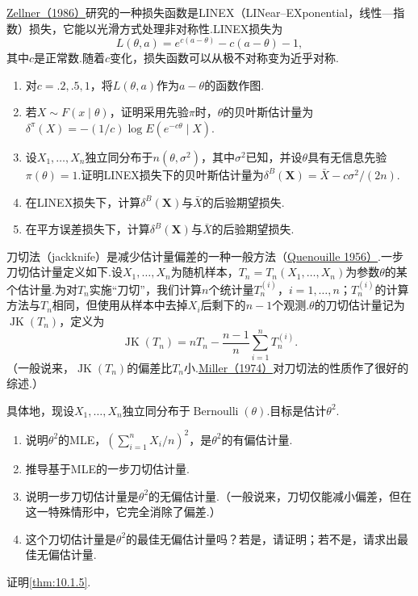 \begin{exercise}\label{exercise:7.65}
\hyperref[bib:source338]{Zellner（1986）}研究的一种损失函数是LINEX（LINear--EXponential，线性—指数）损失，它能以光滑方式处理非对称性.LINEX损失为
$$L(\theta,a)=e^{c(a-\theta)}-c(a-\theta)-1,$$
其中$c$是正常数.随着$c$变化，损失函数可以从极不对称变为近乎对称.
\begin{enumerate}[label=(\alph*)]
\item 对$c=.2,.5,1$，将$L(\theta,a)$作为$a-\theta$的函数作图.
\item 若$X\sim F(x\mid\theta)$，证明采用先验$\pi$时，$\theta$的贝叶斯估计量为$\delta^\pi(X)=-(1/c)\log E(e^{-c\theta}\mid X)$.
\item 设$X_1,\ldots,X_n$独立同分布于$n(\theta,\sigma^2)$，其中$\sigma^2$已知，并设$\theta$具有无信息先验$\pi(\theta)=1$.证明LINEX损失下的贝叶斯估计量为$\delta^B(\boldsymbol X)=\bar X-c\sigma^2/(2n)$.
\item 在LINEX损失下，计算$\delta^B(\boldsymbol X)$与$\bar X$的后验期望损失.
\item 在平方误差损失下，计算$\delta^B(\boldsymbol X)$与$\bar X$的后验期望损失.
\end{enumerate}
\end{exercise}
\begin{exercise}\label{exercise:7.66}
刀切法（jackknife）是减少估计量偏差的一种一般方法（\hyperref[bib:source249]{Quenouille 1956）}.一步刀切估计量定义如下.设$X_1,\ldots,X_n$为随机样本，$T_n=T_n(X_1,\ldots,X_n)$为参数$\theta$的某个估计量.为对$T_n$实施“刀切”，我们计算$n$个统计量$T_n^{(i)}$，$i=1,\ldots,n$；$T_n^{(i)}$的计算方法与$T_n$相同，但使用从样本中去掉$X_i$后剩下的$n-1$个观测.$\theta$的刀切估计量记为$\operatorname{JK}(T_n)$，定义为
$$\operatorname{JK}(T_n)=nT_n-\frac{n-1}{n}\sum_{i=1}^nT_n^{(i)}.$$
（一般说来，$\operatorname{JK}(T_n)$的偏差比$T_n$小.\hyperref[bib:source220]{Miller（1974）}对刀切法的性质作了很好的综述.）

具体地，现设$X_1,\ldots,X_n$独立同分布于$\operatorname{Bernoulli}(\theta)$.目标是估计$\theta^2$.
\begin{enumerate}[label=(\alph*)]
\item 说明$\theta^2$的MLE，$(\sum_{i=1}^nX_i/n)^2$，是$\theta^2$的有偏估计量.
\item 推导基于MLE的一步刀切估计量.
\item 说明一步刀切估计量是$\theta^2$的无偏估计量.（一般说来，刀切仅能减小偏差，但在这一特殊情形中，它完全消除了偏差.）
\item 这个刀切估计量是$\theta^2$的最佳无偏估计量吗？若是，请证明；若不是，请求出最佳无偏估计量.
\end{enumerate}
\end{exercise}
\begin{exercise}\label{exercise:7.67}
证明\autoref{thm:10.1.5}.
\end{exercise}
